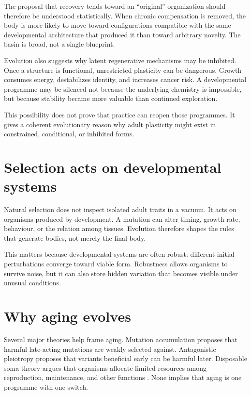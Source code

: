 The proposal that recovery tends toward an ``original'' organization should therefore be understood statistically. When chronic compensation is removed, the body is more likely to move toward configurations compatible with the same developmental architecture that produced it than toward arbitrary novelty. The basin is broad, not a single blueprint.

Evolution also suggests why latent regenerative mechanisms may be inhibited. Once a structure is functional, unrestricted plasticity can be dangerous. Growth consumes energy, destabilizes identity, and increases cancer risk. A developmental programme may be silenced not because the underlying chemistry is impossible, but because stability became more valuable than continued exploration.

This possibility does not prove that practice can reopen those programmes. It gives a coherent evolutionary reason why adult plasticity might exist in constrained, conditional, or inhibited forms.

\section{Selection acts on developmental systems}\label{selection-acts-on-developmental-systems}

Natural selection does not inspect isolated adult traits in a vacuum. It acts on organisms produced by development. A mutation can alter timing, growth rate, behaviour, or the relation among tissues. Evolution therefore shapes the rules that generate bodies, not merely the final body.

This matters because developmental systems are often robust: different initial perturbations converge toward viable form. Robustness allows organisms to survive noise, but it can also store hidden variation that becomes visible under unusual conditions.

\section{Why aging evolves}\label{why-aging-evolves}

Several major theories help frame aging. Mutation accumulation proposes that harmful late-acting mutations are weakly selected against. Antagonistic pleiotropy proposes that variants beneficial early can be harmful later. Disposable soma theory argues that organisms allocate limited resources among reproduction, maintenance, and other functions \autocite{kirkwood2005odd}. None implies that aging is one programme with one switch.

